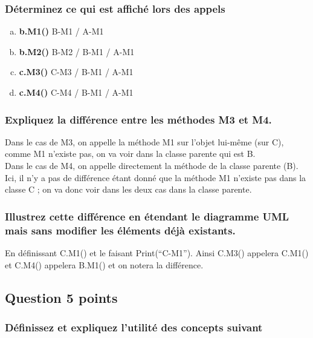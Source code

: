 \subsubsection{Déterminez ce qui est affiché lors des appels}
\begin{enumerate}[a)]
	\item \textbf{b.M1()} \textcolor[rgb]{0,0.48,0.58}{B-M1 / A-M1}
	\item \textbf{b.M2()} \textcolor[rgb]{0,0.48,0.58}{B-M2 / B-M1 / A-M1}
	\item \textbf{c.M3()} \textcolor[rgb]{0,0.48,0.58}{C-M3 / B-M1 / A-M1}
	\item \textbf{c.M4()} \textcolor[rgb]{0,0.48,0.58}{C-M4 / B-M1 / A-M1}
\end{enumerate}



\subsubsection{Expliquez la différence entre les méthodes M3 et M4.}
\textcolor[rgb]{0,0.48,0.58}{Dans le cas de M3, on appelle la méthode M1 sur l'objet lui-même (sur C), comme M1 n'existe pas, on va voir dans la classe parente qui est B.
\\Dans le cas de M4, on appelle directement la méthode de la classe parente (B).
\\Ici, il n'y a pas de différence étant donné que la méthode M1 n'existe pas dans la classe C ; on va donc voir dans les deux cas dans la classe parente.}



\subsubsection{Illustrez cette différence en étendant le diagramme UML mais sans modifier les éléments déjà existants.}
\textcolor[rgb]{0,0.48,0.58}{En définissant C.M1() et le faisant Print(“C-M1”). Ainsi C.M3() appelera C.M1() et C.M4() appelera B.M1() et on notera la différence.}



\subsection{Question 5 points}



\subsubsection{Définissez et expliquez l'utilité des concepts suivant}

